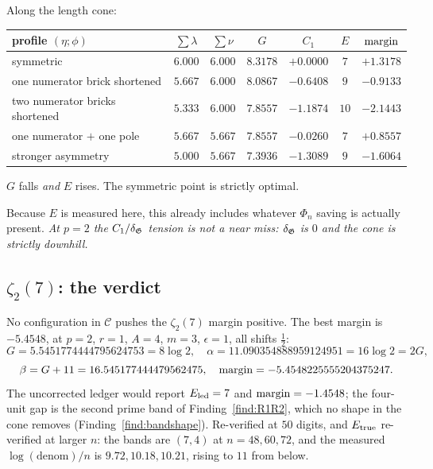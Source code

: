 \begin{finding}\label{find:cone}
 Along the length cone:
\begin{center}
\tabsmall
\begin{tabular}{lcccccc}
\toprule
profile $(\eta;\phi)$ & $\sum\lambda$ & $\sum\nu$ & $G$ & $C_1$ & $E$ & $\operatorname{margin}$\\
\midrule
symmetric & $6.000$ & $6.000$ & $8.3178$ & $+0.0000$ & $7$ & $+1.3178$\\
one numerator brick shortened & $5.667$ & $6.000$ & $8.0867$ & $-0.6408$ & $9$ & $-0.9133$\\
two numerator bricks shortened & $5.333$ & $6.000$ & $7.8557$ & $-1.1874$ & $10$ & $-2.1443$\\
one numerator $+$ one pole & $5.667$ & $5.667$ & $7.8557$ & $-0.0260$ & $7$ & $+0.8557$\\
stronger asymmetry & $5.000$ & $5.667$ & $7.3936$ & $-1.3089$ & $9$ & $-1.6064$\\
\bottomrule
\end{tabular}
\end{center}
$G$ falls \emph{and} $E$ rises. The symmetric point is strictly optimal.
\end{finding}

Because $E$ is measured here, this already includes whatever $\Phi_n$ saving is actually
present. \emph{At $p=2$ the $C_1/\delta_{\mathfrak{G}}$ tension is not a near miss: $\delta_{\mathfrak{G}}$ is $0$ and the cone
is strictly downhill.}

\subsection{\texorpdfstring{$\zeta_2(7)$}{zeta 2(7)}: the verdict}\label{ss:z27}

\begin{finding}\label{find:z27}
 No configuration in $\mathcal C$ pushes the $\zeta_2(7)$ margin
positive. The best margin is $-5.4548$, at $p=2$, $r=1$, $A=4$, $m=3$, $\epsilon=1$, all
shifts $\tfrac12$:
\[
 G=5.5451774444795624753=8\log2,\quad
 \alpha=11.090354888959124951=16\log2=2G,
\]
\[
 \beta=G+11=16.545177444479562475,\quad
 \operatorname{margin}=-5.4548225555204375247 .
\]
The uncorrected ledger would report $E_{\mathrm{led}}=7$ and $\operatorname{margin}=-1.4548$; the four-unit gap is the
second prime band of Finding~\ref{find:R1R2}, which no shape in the cone removes
(Finding~\ref{find:bandshape}). Re-verified at $50$ digits, and $E_{\mathrm{true}}$ re-verified at
larger $n$: the bands are $(7,4)$ at $n=48,60,72$, and the measured $\log(\mathrm{denom})/n$
is $9.72,10.18,10.21$, rising to $11$ from below.
\end{finding}

